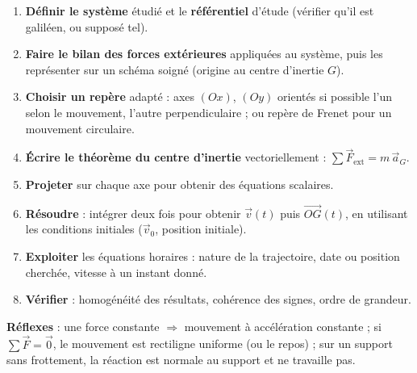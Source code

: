 \documentclass[11pt]{article}
\begin{document}
\begin{methode}
\begin{enumerate}
\item \textbf{Définir le système} étudié et le \textbf{référentiel} d'étude (vérifier qu'il est galiléen, ou supposé tel).
\item \textbf{Faire le bilan des forces extérieures} appliquées au système, puis les représenter sur un schéma soigné (origine au centre d'inertie $G$).
\item \textbf{Choisir un repère} adapté : axes $(Ox)$, $(Oy)$ orientés si possible l'un selon le mouvement, l'autre perpendiculaire ; ou repère de Frenet pour un mouvement circulaire.
\item \textbf{Écrire le théorème du centre d'inertie} vectoriellement : $\sum \vec{F}_{\text{ext}} = m\,\vec{a}_G$.
\item \textbf{Projeter} sur chaque axe pour obtenir des équations scalaires.
\item \textbf{Résoudre} : intégrer deux fois pour obtenir $\vec{v}(t)$ puis $\overrightarrow{OG}(t)$, en utilisant les conditions initiales ($\vec{v}_0$, position initiale).
\item \textbf{Exploiter} les équations horaires : nature de la trajectoire, date ou position cherchée, vitesse à un instant donné.
\item \textbf{Vérifier} : homogénéité des résultats, cohérence des signes, ordre de grandeur.
\end{enumerate}
\textbf{Réflexes} : une force constante $\Rightarrow$ mouvement à accélération constante ; si $\sum \vec{F} = \vec{0}$, le mouvement est rectiligne uniforme (ou le repos) ; sur un support sans frottement, la réaction est normale au support et ne travaille pas.
\end{methode}
\end{document}
